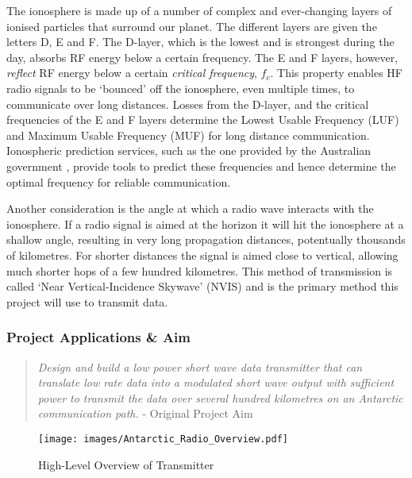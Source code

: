 \documentclass[a4paper,12pt]{article}
\begin{document}
The ionosphere is made up of a number of complex and ever-changing layers of ionised particles that surround our planet. The different layers are given the letters D, E and F. The D-layer, which is the lowest and is strongest during the day, absorbs RF energy below a certain frequency. The E and F layers, however, \textit{reflect} RF energy below a certain \textit{critical frequency}, $f_c$. This property enables HF radio signals to be `bounced' off the ionosphere, even multiple times, to communicate over long distances. Losses from the D-layer, and the critical frequencies of the E and F layers determine the Lowest Usable Frequency (LUF) and Maximum Usable Frequency (MUF) for long distance communication. Ionospheric prediction services, such as the one provided by the Australian government \citep{ref:bom}, provide tools to predict these frequencies and hence determine the optimal frequency for reliable communication.

Another consideration is the angle at which a radio wave interacts with the ionosphere. If a radio signal is aimed at the horizon it will hit the ionosphere at a shallow angle, resulting in very long propagation distances, potentually thousands of kilometres. For shorter distances the signal is aimed close to vertical, allowing much shorter hops of a few hundred kilometres. This method of transmission is called `Near Vertical-Incidence Skywave' (NVIS) and is the primary method this project will use to transmit data.

\subsubsection*{Project Applications \& Aim}

\begin{quote}
\textit{
Design and build a low power short wave data transmitter that can translate low rate data into a modulated short wave output with sufficient power to transmit the data over several hundred kilometres on an Antarctic communication path.}
- Original Project Aim
\end{quote}

\begin{figure}[h]
  \begin{center}
    \texttt{[image: images/Antarctic\_Radio\_Overview.pdf]}
  \end{center}
  \caption{High-Level Overview of Transmitter}
  \label{fig:high_level}
\end{figure}
\end{document}
